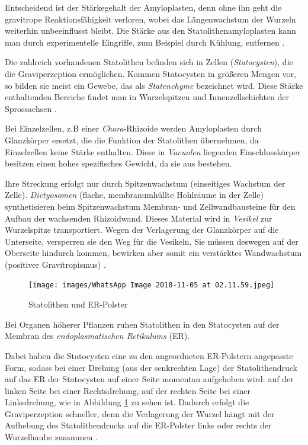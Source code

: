 \documentclass[
11pt, 
ngerman,
listof=totocnumbered,
oneside,
bibliography=totocnumbered,
abstracton
]{scrreprt}
\begin{document}
Entscheidend ist der Stärkegehalt der Amyloplasten, denn ohne ihn geht die gravitrope Reaktionsfähigkeit verloren, wobei das Längenwachstum der Wurzeln weiterhin unbeeinflusst bleibt.
Die Stärke aus den Statolithenamyloplasten kann man durch experimentelle Eingriffe, zum Beispiel durch Kühlung, entfernen \parencite[452]{Strasburger}.

Die zahlreich vorhandenen Statolithen befinden sich in Zellen (\emph{Statocysten}), die die Graviperzeption ermöglichen. Kommen Statocysten in größeren Mengen vor, so bilden sie meist ein Gewebe, das als \emph{Statenchyme} bezeichnet wird. Diese Stärke enthaltenden Bereiche findet man in Wurzelspitzen und Innenzellschichten der Sprossachsen \parencite[501--502]{Nultsch}.  


Bei Einzelzellen, z.B einer \emph{Chara}-Rhizoide werden Amyloplasten durch {\glqq Glanzkörper\grqq} ersetzt, die die Funktion der Statolithen übernehmen, da Einzelzellen keine Stärke enthalten. Diese in \emph{Vacuolen} liegenden Einschlusskörper besitzen einen hohes spezifisches Gewicht, da sie aus  bestehen.

Ihre Streckung erfolgt nur durch Spitzenwachstum (einseitiges Wachstum der Zelle).
\emph{Dictyosomen} (flache, membranumhüllte Hohlräume in der Zelle) synthetisieren beim Spitzenwachstum Membran- und Zellwandbausteine für den Aufbau der wachsenden Rhizoidwand. Dieses Material wird in \emph{Vesikel} zur Wurzelspitze transportiert.
Wegen der Verlagerung der {\glqq Glanzkörper\grqq} auf die Unterseite, versperren sie den Weg für die Vesikeln. Sie müssen deswegen auf der Oberseite hindurch kommen, bewirken aber somit ein verstärktes Wandwachstum (positiver Gravitropismus) \parencite[453--454]{Strasburger}.
  

 \begin{figure}[H]
 	\centering 
 	\texttt{[image: images/WhatsApp Image 2018-11-05 at 02.11.59.jpeg]}
 	\caption{Statolithen und ER-Polster \parencite[533]{Luettge} \label{Graviperzeption}}
 \end{figure} 
 
Bei Organen höherer Pflanzen ruhen Statolithen in den Statocysten auf der Membran des \emph{endoplasmatischen Retikulums} (ER).

 Dabei haben die Statocysten eine zu den angeordneten ER-Polstern angepasste Form, sodass bei einer Drehung (aus der senkrechten Lage) der Statolithendruck auf das ER der Statocysten auf einer Seite momentan aufgehoben wird: auf der linken Seite bei einer Rechtsdrehung, auf der rechten Seite bei einer Linksdrehung, wie in Abbildung \ref{Graviperzeption} zu sehen ist.
Dadurch erfolgt die Graviperzeption schneller, denn die Verlagerung der Wurzel hängt  mit der Aufhebung des Statolithendrucks auf die ER-Polster links oder rechts der Wurzelhaube zusammen \parencite[531--532]{Luettge}. 
\end{document}
